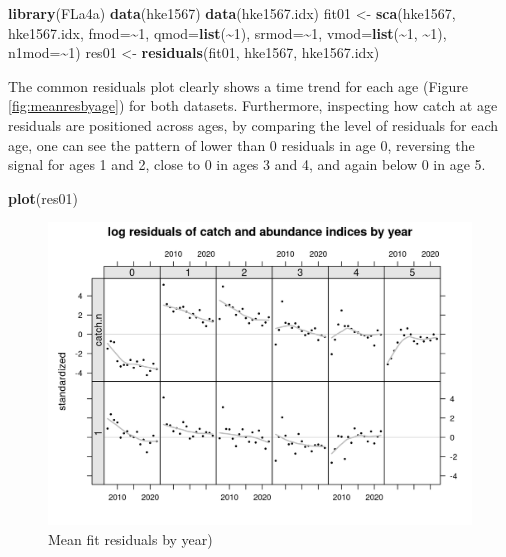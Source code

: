 \documentclass[
]{book}
\newenvironment{Shaded}{\begin{snugshade}}{\end{snugshade}}
\newcommand{\AttributeTok}[1]{\textcolor[rgb]{0.13,0.29,0.53}{#1}}
\newcommand{\DecValTok}[1]{\textcolor[rgb]{0.00,0.00,0.81}{#1}}
\newcommand{\FunctionTok}[1]{\textcolor[rgb]{0.13,0.29,0.53}{\textbf{#1}}}
\newcommand{\NormalTok}[1]{#1}
\newcommand{\OtherTok}[1]{\textcolor[rgb]{0.56,0.35,0.01}{#1}}
\newcommand{\SpecialCharTok}[1]{\textcolor[rgb]{0.81,0.36,0.00}{\textbf{#1}}}
\begin{document}
\begin{Shaded}
\begin{Highlighting}[]
\FunctionTok{library}\NormalTok{(FLa4a)}
\FunctionTok{data}\NormalTok{(hke1567)}
\FunctionTok{data}\NormalTok{(hke1567.idx)}
\NormalTok{fit01 }\OtherTok{\textless{}{-}} \FunctionTok{sca}\NormalTok{(hke1567, hke1567.idx,}
    \AttributeTok{fmod=}\SpecialCharTok{\textasciitilde{}}\DecValTok{1}\NormalTok{,}
    \AttributeTok{qmod=}\FunctionTok{list}\NormalTok{(}\SpecialCharTok{\textasciitilde{}}\DecValTok{1}\NormalTok{),}
    \AttributeTok{srmod=}\SpecialCharTok{\textasciitilde{}}\DecValTok{1}\NormalTok{,}
    \AttributeTok{vmod=}\FunctionTok{list}\NormalTok{(}\SpecialCharTok{\textasciitilde{}}\DecValTok{1}\NormalTok{, }\SpecialCharTok{\textasciitilde{}}\DecValTok{1}\NormalTok{),}
    \AttributeTok{n1mod=}\SpecialCharTok{\textasciitilde{}}\DecValTok{1}\NormalTok{)}
\NormalTok{res01 }\OtherTok{\textless{}{-}} \FunctionTok{residuals}\NormalTok{(fit01, hke1567, hke1567.idx)}
\end{Highlighting}
\end{Shaded}

The common residuals plot clearly shows a time trend for each age (Figure \ref{fig:meanresbyage}) for both datasets. Furthermore, inspecting how catch at age residuals are positioned across ages, by comparing the level of residuals for each age, one can see the pattern of lower than 0 residuals in age 0, reversing the signal for ages 1 and 2, close to 0 in ages 3 and 4, and again below 0 in age 5.

\begin{Shaded}
\begin{Highlighting}[]
\FunctionTok{plot}\NormalTok{(res01)}
\end{Highlighting}
\end{Shaded}

\begin{figure}
\centering
\includegraphics{_bookdown_files/_main_files/figure-html/meanresbyyear-1.png}
\caption{\label{fig:meanresbyyear}Mean fit residuals by year)}
\end{figure}
\end{document}
